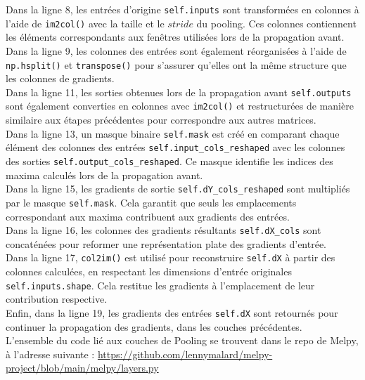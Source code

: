 \begin{multicols}{2}
Dans la ligne 8, les entrées d’origine \texttt{self.inputs} sont transformées en colonnes à l’aide de \texttt{im2col()} 
avec la taille et le $stride$ du pooling. Ces colonnes contiennent les éléments correspondants aux fenêtres utilisées 
lors de la propagation avant. \\

Dans la ligne 9, les colonnes des entrées sont également réorganisées à l’aide de \texttt{np.hsplit()} et \texttt{transpose()} 
pour s’assurer qu’elles ont la même structure que les colonnes de gradients. \\

Dans la ligne 11, les sorties obtenues lors de la propagation avant \texttt{self.outputs} sont également converties en colonnes 
avec \texttt{im2col()} et restructurées de manière similaire aux étapes précédentes pour correspondre aux autres matrices. \\

Dans la ligne 13, un masque binaire \texttt{self.mask} est créé en comparant chaque élément des colonnes
des entrées \texttt{self.input\_cols\_reshaped} avec les colonnes des sorties \texttt{self.output\_cols\_reshaped}. 
Ce masque identifie les indices des maxima calculés lors de la propagation avant. \\

Dans la ligne 15, les gradients de sortie \texttt{self.dY\_cols\_reshaped} sont multipliés par le masque \texttt{self.mask}. Cela garantit que seuls 
les emplacements correspondant aux maxima contribuent aux gradients des entrées. \\

Dans la ligne 16, les colonnes des gradients résultants \texttt{self.dX\_cols} sont concaténées pour reformer une 
représentation plate des gradients d’entrée. \\

Dans la ligne 17, \texttt{col2im()} est utilisé pour reconstruire \texttt{self.dX} à partir des colonnes calculées, en respectant 
les dimensions d’entrée originales \texttt{self.inputs.shape}. Cela restitue les gradients à l'emplacement de leur contribution respective. \\

Enfin, dans la ligne 19, les gradients des entrées \texttt{self.dX} sont retournés pour continuer la propagation des gradients, dans les couches précédentes. \\

L'ensemble du code lié aux couches de Pooling se trouvent dans le repo de Melpy, à l'adresse suivante : \url{https://github.com/lennymalard/melpy-project/blob/main/melpy/layers.py}

\end{multicols}


